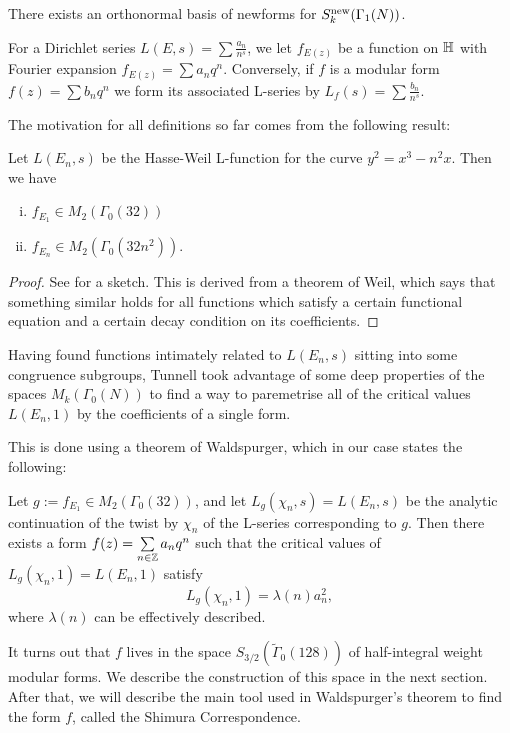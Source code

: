 \documentclass[12pt, a4paper]{amsart}
\begin{document}
\begin{prop}
  There exists an orthonormal basis of newforms for $S_k^{\textnormal{new}}(\Gamma_1(N))$.
\end{prop}

For a Dirichlet series $L(E, s) = \sum \frac{a_n}{n^s}$, we let $f_{E(z)}$ be a
function on $\mathbb{H}$ with Fourier expansion $f_{E(z)} = \sum a_n q^n.$ Conversely,
if $f$ is a modular form $f(z) = \sum b_n q^n$ we form its associated L-series
by $L_f(s) = \sum \frac{b_n}{n^s}.$

The motivation for all definitions so far comes from the following result:

\begin{prop}
  Let $L(E_n,s)$ be the Hasse-Weil L-function for the curve $y^2 = x^3-n^2x$.
  Then we have
  \begin{enumerate}[(i)]
  \item $f_{E_1} \in M_2(\Gamma_0(32))$
  \item $f_{E_n} \in M_2(\Gamma_0(32n^2))$.
  \end{enumerate}
\end{prop}
\begin{proof}
  See \cite[Pages 140-143]{koblitz} for a sketch. This is derived from a theorem
  of Weil, which says that something similar holds for all functions which satisfy
  a certain functional equation and a certain decay condition on its
  coefficients.
\end{proof}

Having found functions intimately related to $L(E_n,s)$ sitting into some
congruence subgroups, Tunnell took advantage of some deep properties of the
spaces $M_k(\Gamma_0(N))$ to find a way to paremetrise all of the critical
values $L(E_n,1)$ by the coefficients of a single form.

This is done using a theorem of Waldspurger, which in our case states the
following:

Let $g := f_{E_1} \in M_2(\Gamma_0(32))$, and let $L_g(\chi_n, s) = L(E_n,s)$
be the analytic continuation of the twist by $\chi_n$ of the L-series
corresponding to $g$. 
Then there exists a form $f(z) = \sum\limits_{n \in {\mathbb Z}} a_nq^n$ 
such that the critical values of
$L_g(\chi_n,1) = L(E_n,1)$ satisfy
\[L_g(\chi_n,1) = \lambda(n) a_n^2,\]
where $\lambda(n)$ can be effectively described.

It turns out that $f$ lives in the space $S_{3/2}(\tilde{\Gamma}_0(128))$ of
half-integral weight modular forms. We describe the construction of this space
in the next section. After that, we will describe the main tool used in
Waldspurger's theorem to find the form $f$, called the Shimura Correspondence.
\end{document}
